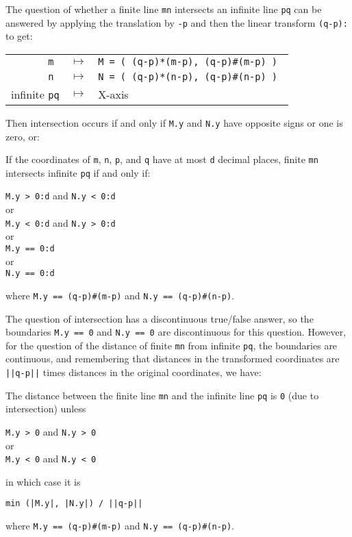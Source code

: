 \documentclass[12pt]{article}
\begin{document}
The question of whether a finite line {\tt mn} intersects an
infinite line {\tt pq} can be answered by applying the translation
by {\tt -p} and then the linear transform {\tt (q-p):} to get:
\begin{center}
\begin{tabular}{rcl}
\tt m & $\longmapsto$ & \tt M = ( (q-p)*(m-p), (q-p)\#(m-p) ) \\
\tt n & $\longmapsto$ & \tt N = ( (q-p)*(n-p), (q-p)\#(n-p) ) \\
infinite {\tt pq} & $\longmapsto$ & X-axis \\
\end{tabular}
\end{center}
Then intersection occurs if and only if {\tt M.y} and {\tt N.y}
have opposite signs or one is zero, or:
\begin{theorem}
If the coordinates of {\tt m},
{\tt n}, {\tt p}, and {\tt q} have at most {\tt d} decimal places,
finite {\tt mn} intersects infinite {\tt pq} if and only if:
\begin{center}
{\tt M.y > 0:d} and {\tt N.y < 0:d} \\
or \\
{\tt M.y < 0:d} and {\tt N.y > 0:d} \\
or \\
{\tt M.y == 0:d} \\
or \\
{\tt N.y == 0:d}
\end{center}
where {\tt M.y == (q-p)\#(m-p)} and {\tt N.y == (q-p)\#(n-p)}.
\end{theorem}
The question of intersection has a discontinuous true/false
answer, so the boundaries {\tt M.y == 0} and {\tt N.y == 0}
are discontinuous for this question.  However, for the
question of the distance of finite {\tt mn} from infinite {\tt pq},
the boundaries are continuous, and remembering that distances in
the transformed coordinates are {\tt ||q-p||} times distances
in the original coordinates, we have:
\begin{theorem}
The distance between the finite line {\tt mn} and the infinite
line {\tt pq} is {\tt 0} (due to intersection) unless
\begin{center}
{\tt M.y > 0} and {\tt N.y > 0} \\
or \\
{\tt M.y < 0} and {\tt N.y < 0} \\
\end{center}
in which case it is \\
\centerline{\tt min (|M.y|, |N.y|) / ||q-p||}

where {\tt M.y == (q-p)\#(m-p)} and {\tt N.y == (q-p)\#(n-p)}.
\end{theorem}
\end{document}

